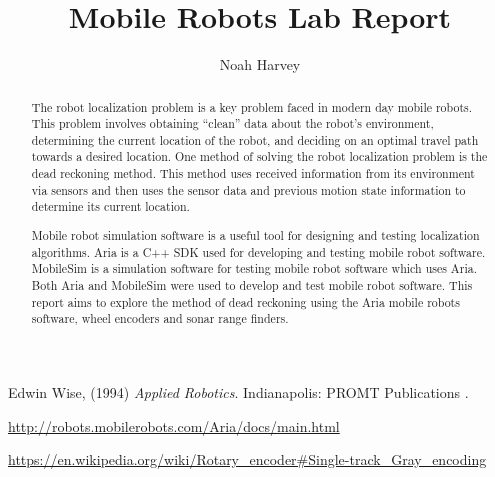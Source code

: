 \documentclass[a4paper,titlepage]{article}
\begin{document}
	\title{Mobile Robots Lab Report}
	\author{Noah Harvey}
	\maketitle

	\begin{abstract}

	The robot localization problem is a key problem faced in modern day mobile
	robots. This problem involves obtaining ``clean'' data about the robot's
	environment, determining the current location of the robot, and deciding on an
	optimal travel path towards a desired location. One method of solving the
	robot localization problem is the dead reckoning method. This method uses
	received information from its environment via sensors and then uses the sensor
	data and previous motion state information to determine its current location. 

	Mobile robot simulation software is a useful tool for designing and testing
	localization algorithms. Aria is a C++ SDK used for developing and testing
	mobile robot software. MobileSim is a simulation software for testing mobile
	robot software which uses Aria. Both Aria and MobileSim were used to develop
	and test mobile robot software. This report aims to explore the method of dead
	reckoning using the Aria mobile robots software, wheel encoders and sonar
	range finders. 
	
	\end{abstract}

	\tableofcontents
	\listoftables
	\listoffigures

	\pagebreak
	
	
	\pagebreak
	

	\pagebreak

	\begin{thebibliography}{9}
			Edwin Wise,
			(1994)
			\emph{Applied Robotics}.
			Indianapolis: PROMT Publications .

			\url{http://robots.mobilerobots.com/Aria/docs/main.html}
			
			\url{https://en.wikipedia.org/wiki/Rotary_encoder#Single-track_Gray_encoding}


	\end{thebibliography}
\end{document}
